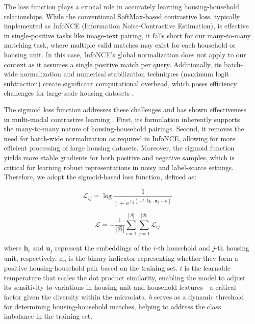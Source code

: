 \documentclass[]{nature_mod}
\begin{document}
The loss function plays a crucial role in accurately learning housing-household relationships. While the conventional SoftMax-based contrastive loss, typically implemented as InfoNCE (Information Noise-Contrastive Estimation), is effective in single-positive tasks like image-text pairing, it falls short for our many-to-many matching task, where multiple valid matches may exist for each household or housing unit. In this case, InfoNCE’s global normalization does not apply to our context as it assumes a single positive match per query. Additionally, its batch-wide normalization and numerical stabilization techniques (maximum logit subtraction) create significant computational overhead, which poses efficiency challenges for large-scale housing datasets \cite{zhai2023sigmoid}. 

The sigmoid loss function addresses these challenges and has shown effectiveness in multi-modal contrastive learning \cite{zhai2023sigmoid}. First, its formulation inherently supports the many-to-many nature of housing-household pairings. Second, it removes the need for batch-wide normalization as required in InfoNCE, allowing for more efficient processing of large housing datasets. Moreover, the sigmoid function yields more stable gradients for both positive and negative samples, which is critical for learning robust representations in noisy and label-scarce settings. Therefore, we adopt the sigmoid-based loss function, defined as:

\begin{equation} \mathcal{L}_{ij} = \log\frac{1}{1+e^{z_{ij}(-t \cdot \mathbf{h}_i\cdot\mathbf{u}_j+b)}} \end{equation}

\begin{equation} \mathcal{L} = -\frac{1}{|\mathcal{B}|}\sum_{i=1}^{|\mathcal{B}|}\sum_{j=1}^{|\mathcal{B}|}\mathcal{L}_{ij} \end{equation}

where $\mathbf{h}_i$ and $\mathbf{u}_j$ represent the embeddings of the $i$-th household and $j$-th housing unit, respectively. $z_{ij}$ is the binary indicator representing whether they form a positive housing-household pair based on the training set. $t$ is the learnable temperature that scales the dot product similarity, enabling the model to adjust its sensitivity to variations in housing unit and household features—a critical factor given the diversity within the microdata. $b$ serves as a dynamic threshold for determining housing-household matches, helping to address the class imbalance in the training set. 
\end{document}
